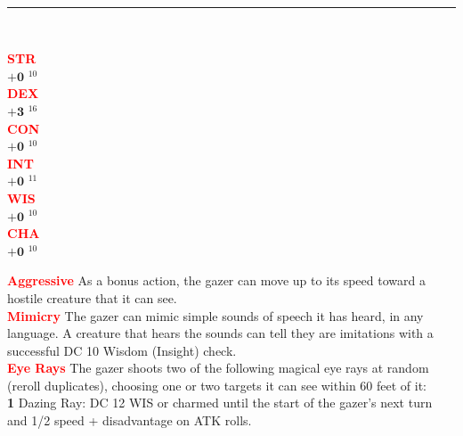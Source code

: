 \documentclass{article}
\begin{document}
\begin{adjustbox}{minipage=0.45\textwidth, margin=\fboxsep, bgimage=../images/texture2.pdf}
{\begin{minipage}[t][10.5in][t]{0.9\textwidth}
\begin{minipage}[t]{0.7\textwidth}
        \end{minipage}
        \vspace{0.025in}\\
        \rule{\textwidth}{1pt}\\
        \vspace{0.025in}
        \begin{minipage}[t]{0.2\textwidth}
            {\large
            \textcolor{red}{\textbf{STR}}\\[0.1em]
            $\mathbf{+0}$\,\,$^{10}$ \\[0.1em]
            \textcolor{red}{\textbf{DEX}}\\[0.1em]
            $\mathbf{+3}$\,\,$^{16}$ \\[0.1em]
            \textcolor{red}{\textbf{CON}}\\[0.1em]
            $\mathbf{+0}$\,\,$^{10}$ \\[0.1em]
            \textcolor{red}{\textbf{INT}}\\[0.1em]
            $\mathbf{+0}$\,\,$^{11}$ \\[0.1em]
            \textcolor{red}{\textbf{WIS}}\\[0.1em]
            $\mathbf{+0}$\,\,$^{10}$ \\[0.1em]
            \textcolor{red}{\textbf{CHA}}\\[0.1em]
            $\mathbf{+0}$\,\,$^{10}$ \\[0.1em]
            }
        \end{minipage}
        \hspace{-0.1in}
        \vline
        \hspace{0.1in}
        \begin{minipage}[t]{0.7\textwidth}
            \textcolor{red}{\textbf{Aggressive}}  As a bonus action, the gazer can move up to its speed toward a hostile creature that it can see. \\[0.2em]
            \textcolor{red}{\textbf{Mimicry}} The gazer can mimic simple sounds of speech it has heard, in any language. A creature that hears the sounds can tell they are imitations with a successful DC 10 Wisdom (Insight) check. \\[0.2em]
            \textcolor{red}{\textbf{Eye Rays}} The gazer shoots two of the following magical eye rays at random (reroll duplicates), choosing one or two targets it can see within 60 feet of it: \\
			\textbf{1} Dazing Ray: DC 12 WIS or charmed until the start of the gazer's next turn and 1/2 speed + disadvantage on ATK rolls.\\

\end{minipage}
\end{minipage}}
\end{adjustbox}
\end{document}
